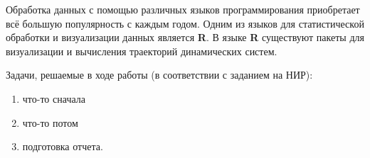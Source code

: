 

Обработка данных с помощью различных языков программирования приобретает всё большую популярность с каждым годом. Одним из языков для статистической обработки и визуализации данных является \textbf{R}. В языке \textbf{R} существуют пакеты для визуализации и вычисления траекторий динамических систем. 

Задачи, решаемые в ходе работы (в соответствии с заданием на НИР):

\begin{enumerate}
    \item что-то сначала
    \item что-то потом
    \item подготовка отчета. 
	
\end{enumerate}
